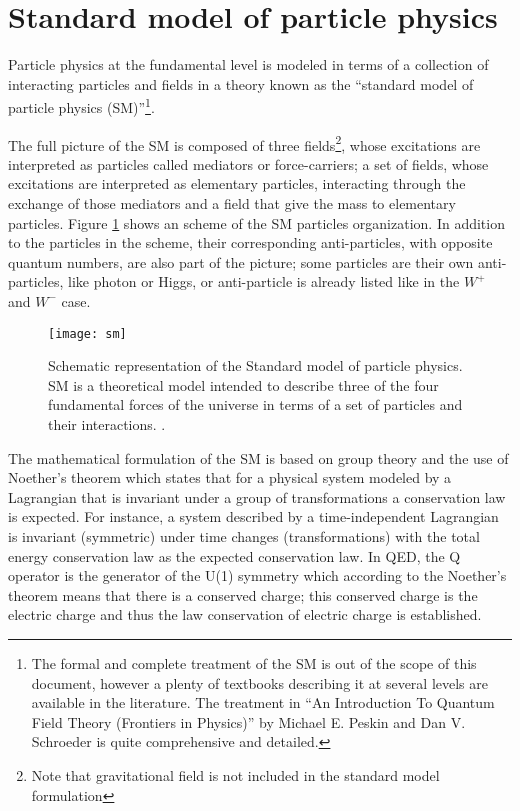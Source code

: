 \section{Standard model of particle physics}
\label{secc:SM}

\noindent Particle physics at the fundamental level is modeled in terms of a collection of interacting particles and fields in a theory known as the ``standard model of particle physics (SM)''\footnote{The formal and complete treatment of the SM is out of the scope of this document, however a plenty of textbooks describing it at several levels are available in the literature. The treatment in ``An Introduction To Quantum Field Theory (Frontiers in Physics)'' by  Michael E. Peskin and Dan V. Schroeder is quite comprehensive and detailed.}.

\noindent The full picture of the SM is composed of three fields\footnote{Note that gravitational field is not included in the standard model formulation}, whose excitations are interpreted as particles called mediators or force-carriers; a set of fields, whose excitations are interpreted as elementary particles, interacting through the exchange of those mediators and a field that give the mass to elementary particles. Figure \ref{sm} shows an scheme of the SM particles organization. In addition to the particles in the scheme, their corresponding anti-particles, with opposite quantum numbers, are also part of the picture; some particles are their own anti-particles, like photon or Higgs, or anti-particle is already listed like in the $W^+$  and $W^-$ case.

\begin{figure}[h!]
  \centering
  \texttt{[image: sm]}
  \caption[Standard model of particle physics.]{Schematic representation of the Standard model of particle physics. SM is a theoretical model intended to describe three of the four fundamental forces of the universe in terms of a set of particles and their interactions. \cite{smpicture}.}
  \label{sm}
\end{figure}

\noindent The mathematical formulation of the SM is based on group theory and the use of Noether's theorem\cite{noether} which states that for a physical system modeled by a Lagrangian that is invariant under a group of transformations a conservation law is expected. For instance, a system described by a time-independent Lagrangian is invariant (symmetric) under time changes (transformations) with the total energy conservation law as the expected conservation law. In QED, the Q operator is the generator of the U(1) symmetry which according to the Noether's theorem means that there is a conserved charge; this conserved charge is the electric charge and thus the law conservation of electric charge is established.

